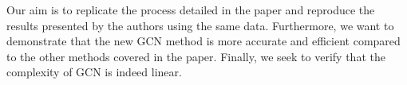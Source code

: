 \documentclass[11pt,a4paper]{article}
\begin{document}
Our aim is to replicate the process detailed in the paper and reproduce the results presented by the authors using the same data. Furthermore, we want to demonstrate that the new GCN method is more accurate and efficient compared to the other methods covered in the paper. Finally, we seek to verify that the complexity of GCN is indeed linear.






\end{document}
